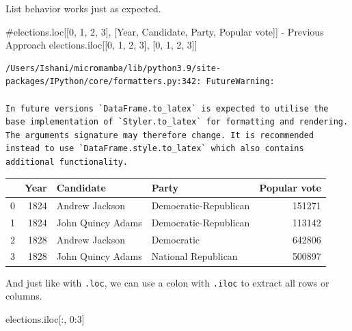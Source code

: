 \documentclass[
  letterpaper,
  DIV=11,
  numbers=noendperiod]{scrreprt}
\newenvironment{Shaded}{\begin{snugshade}}{\end{snugshade}}
\newcommand{\CommentTok}[1]{\textcolor[rgb]{0.37,0.37,0.37}{#1}}
\newcommand{\DecValTok}[1]{\textcolor[rgb]{0.68,0.00,0.00}{#1}}
\newcommand{\NormalTok}[1]{\textcolor[rgb]{0.00,0.23,0.31}{#1}}
\begin{document}
List behavior works just as expected.

\begin{Shaded}
\begin{Highlighting}[]
\CommentTok{\#elections.loc[[0, 1, 2, 3], [\textquotesingle{}Year\textquotesingle{}, \textquotesingle{}Candidate\textquotesingle{}, \textquotesingle{}Party\textquotesingle{}, \textquotesingle{}Popular vote\textquotesingle{}]] {-} Previous Approach}
\NormalTok{elections.iloc[[}\DecValTok{0}\NormalTok{, }\DecValTok{1}\NormalTok{, }\DecValTok{2}\NormalTok{, }\DecValTok{3}\NormalTok{], [}\DecValTok{0}\NormalTok{, }\DecValTok{1}\NormalTok{, }\DecValTok{2}\NormalTok{, }\DecValTok{3}\NormalTok{]]}
\end{Highlighting}
\end{Shaded}

\begin{verbatim}
/Users/Ishani/micromamba/lib/python3.9/site-packages/IPython/core/formatters.py:342: FutureWarning:

In future versions `DataFrame.to_latex` is expected to utilise the base implementation of `Styler.to_latex` for formatting and rendering. The arguments signature may therefore change. It is recommended instead to use `DataFrame.style.to_latex` which also contains additional functionality.
\end{verbatim}

\begin{tabular}{lrllr}
\toprule
{} &  Year &          Candidate &                  Party &  Popular vote \\
\midrule
0 &  1824 &     Andrew Jackson &  Democratic-Republican &        151271 \\
1 &  1824 &  John Quincy Adams &  Democratic-Republican &        113142 \\
2 &  1828 &     Andrew Jackson &             Democratic &        642806 \\
3 &  1828 &  John Quincy Adams &    National Republican &        500897 \\
\bottomrule
\end{tabular}

And just like with \texttt{.loc}, we can use a colon with \texttt{.iloc}
to extract all rows or columns.

\begin{Shaded}
\begin{Highlighting}[]
\NormalTok{elections.iloc[:, }\DecValTok{0}\NormalTok{:}\DecValTok{3}\NormalTok{]}
\end{Highlighting}
\end{Shaded}
\end{document}
